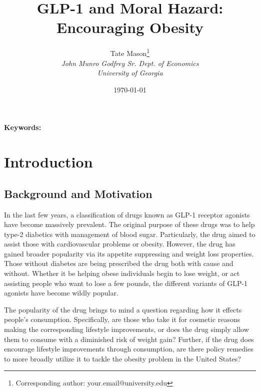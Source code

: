 \documentclass[11pt,a4paper]{article}
\title{GLP-1 and Moral Hazard: Encouraging Obesity}
\author{
    Tate Mason\thanks{Corresponding author: your.email@university.edu} \\
    \textit{John Munro Godfrey Sr. Dept. of Economics} \\
    \textit{University of Georgia} \\
}
\date{\today}
\newenvironment{abstract}%
{\cleardoublepage\null \vfill\begin{center}%
\bfseries \abstractname \end{center}}%
{\vfill\null}
\begin{document}
\maketitle
\thispagestyle{empty}

\begin{abstract}
\noindent %

\vspace{0.3cm}
\noindent \textbf{Keywords:} %
\end{abstract}

\newpage
\setcounter{page}{1}

\section{Introduction}
\label{sec:introduction}


\subsection{Background and Motivation}
\label{subsec:background}

In the last few years, a classification of drugs known as GLP-1 receptor agonists have become massively prevalent. The original purpose
of these drugs was to help type-2 diabetics with management of blood sugar. Particularly, the drug aimed to assist those with 
cardiovascular problems or obesity. However, the drug has gained broader popularity via its appetite suppressing and weight loss properties. Those without diabetes
are being prescribed the drug both with cause and without. Whether it be helping obese individuals begin to lose weight, or act
assisting people who want to lose a few pounds, the different variants of GLP-1 agonists have become wildly popular. 

The popularity of the drug brings to mind a question regarding how it effects people's consumption. Specifically, are those who
take it for cosmetic reasons making the corresponding lifestyle improvements, or does the drug simply allow them to consume with
a diminished risk of weight gain? Further, if the drug does encourage lifestyle improvements through consumption, are there policy
remedies to more broadly utilize it to tackle the obesity problem in the United States?
\end{document}
